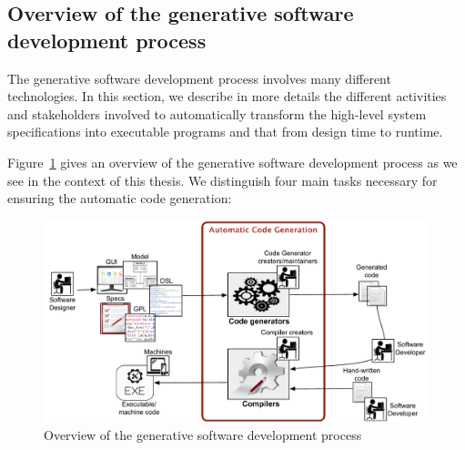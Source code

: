 

\subsection{Overview of the generative software development process}
The generative software development process involves many different technologies. In this section, we describe in more details the different activities and stakeholders involved to automatically transform the high-level system specifications into executable programs and that from design time to runtime.

Figure~\ref{fig:background_overview2} gives an overview of the generative software development process as we see in the context of this thesis. We distinguish four main tasks necessary for ensuring the automatic code generation: 

\begin{figure}[h]
	\center
	\includegraphics[scale=0.65]{Background/fig/background_overview2.pdf}
	\caption{Overview of the generative software development process}
	\label{fig:background_overview2}
\end{figure}

